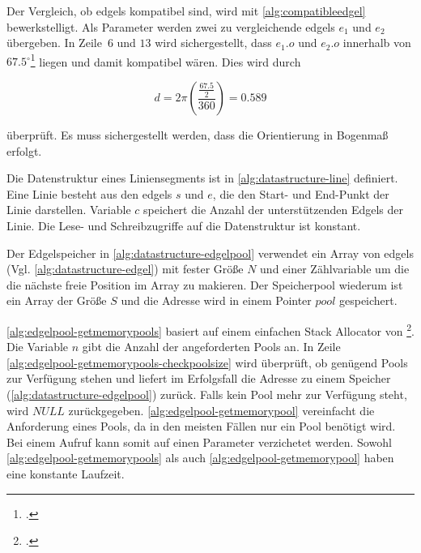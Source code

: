 

Der Vergleich, ob \gls{edgels} kompatibel sind, wird mit \autoref{alg:compatibleedgel} bewerkstelligt. Als Parameter
 werden zwei zu vergleichende \gls{edgels} $e_1$ und $e_2$ übergeben. In Zeile~$6$ und $13$ wird sichergestellt, dass
 $e_1.o$ und $e_2.o$ innerhalb von $67.5^\circ$\footcite[Vgl.][S.~417]{clarke96} liegen und damit kompatibel wären.
 Dies wird durch

\begin{equation}
	d = 2 \pi \left( \frac{ \frac{67.5}{2} }{360} \right) = 0.589
\end{equation}

überprüft. Es muss sichergestellt werden, dass die Orientierung in Bogenmaß erfolgt.


Die Datenstruktur eines Liniensegments ist in \autoref{alg:datastructure-line} definiert. Eine Linie besteht aus den
 \gls{edgels} $s$ und $e$, die den Start- und End-Punkt der Linie darstellen. Variable $c$ speichert die Anzahl der
 unterstützenden Edgels der Linie. Die Lese- und Schreibzugriffe auf die Datenstruktur ist konstant.

Der Edgelspeicher in \autoref{alg:datastructure-edgelpool} verwendet ein Array von \gls{edgels}
 (Vgl. \autoref{alg:datastructure-edgel}) mit fester Größe $N$ und einer Zählvariable um die die nächste freie Position
 im Array zu makieren. Der Speicherpool wiederum ist ein Array der Größe $S$ und die Adresse wird in einem Pointer
 $\mathit{pool}$ gespeichert.



\autoref{alg:edgelpool-getmemorypools} basiert auf einem einfachen Stack Allocator von
 \citeauthor{kr}\footcite[Vgl.][S.~100--104]{kr}. Die Variable $n$ gibt die Anzahl der angeforderten Pools an. In Zeile
 \ref{alg:edgelpool-getmemorypools-checkpoolsize} wird überprüft, ob genügend Pools zur Verfügung stehen und liefert im
 Erfolgsfall die Adresse zu einem Speicher (\autoref{alg:datastructure-edgelpool}) zurück. Falls kein Pool mehr zur
 Verfügung steht, wird $\mathit{NULL}$ zurückgegeben. \autoref{alg:edgelpool-getmemorypool} vereinfacht die Anforderung
 eines Pools, da in den meisten Fällen nur ein Pool benötigt wird. Bei einem Aufruf kann somit auf einen Parameter
 verzichetet werden. Sowohl \autoref{alg:edgelpool-getmemorypools} als auch \autoref{alg:edgelpool-getmemorypool} haben
 eine konstante Laufzeit.




